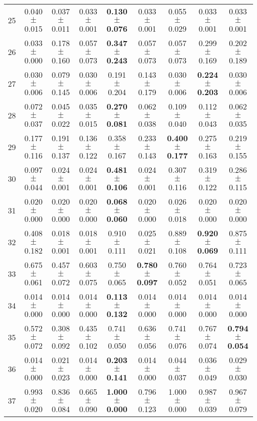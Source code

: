 \begin{table}[!ht]
{\begin{tabular}{r c c c c c c c c}
25 & 0.040 $\pm$ 0.015 & 0.037 $\pm$ 0.011 & 0.033 $\pm$ 0.001 & \textbf{0.130 $\pm$ 0.076} & 0.033 $\pm$ 0.001 & 0.055 $\pm$ 0.029 & 0.033 $\pm$ 0.001 & 0.033 $\pm$ 0.001 \\
26 & 0.033 $\pm$ 0.000 & 0.178 $\pm$ 0.160 & 0.057 $\pm$ 0.073 & \textbf{0.347 $\pm$ 0.243} & 0.057 $\pm$ 0.073 & 0.057 $\pm$ 0.073 & 0.299 $\pm$ 0.169 & 0.202 $\pm$ 0.189 \\
27 & 0.030 $\pm$ 0.006 & 0.079 $\pm$ 0.145 & 0.030 $\pm$ 0.006 & 0.191 $\pm$ 0.204 & 0.143 $\pm$ 0.179 & 0.030 $\pm$ 0.006 & \textbf{0.224 $\pm$ 0.203} & 0.030 $\pm$ 0.006 \\
28 & 0.072 $\pm$ 0.037 & 0.045 $\pm$ 0.022 & 0.035 $\pm$ 0.015 & \textbf{0.270 $\pm$ 0.081} & 0.062 $\pm$ 0.038 & 0.109 $\pm$ 0.040 & 0.112 $\pm$ 0.043 & 0.062 $\pm$ 0.035 \\
29 & 0.177 $\pm$ 0.116 & 0.191 $\pm$ 0.137 & 0.136 $\pm$ 0.122 & 0.358 $\pm$ 0.167 & 0.233 $\pm$ 0.143 & \textbf{0.400 $\pm$ 0.177} & 0.275 $\pm$ 0.163 & 0.219 $\pm$ 0.155 \\
30 & 0.097 $\pm$ 0.044 & 0.024 $\pm$ 0.001 & 0.024 $\pm$ 0.001 & \textbf{0.481 $\pm$ 0.106} & 0.024 $\pm$ 0.001 & 0.307 $\pm$ 0.116 & 0.319 $\pm$ 0.122 & 0.286 $\pm$ 0.115 \\
31 & 0.020 $\pm$ 0.000 & 0.020 $\pm$ 0.000 & 0.020 $\pm$ 0.000 & \textbf{0.068 $\pm$ 0.060} & 0.020 $\pm$ 0.000 & 0.026 $\pm$ 0.018 & 0.020 $\pm$ 0.000 & 0.020 $\pm$ 0.000 \\
32 & 0.408 $\pm$ 0.182 & 0.018 $\pm$ 0.001 & 0.018 $\pm$ 0.001 & 0.910 $\pm$ 0.111 & 0.025 $\pm$ 0.021 & 0.889 $\pm$ 0.108 & \textbf{0.920 $\pm$ 0.069} & 0.875 $\pm$ 0.111 \\
33 & 0.675 $\pm$ 0.061 & 0.457 $\pm$ 0.072 & 0.603 $\pm$ 0.075 & 0.750 $\pm$ 0.065 & \textbf{0.780 $\pm$ 0.097} & 0.760 $\pm$ 0.052 & 0.764 $\pm$ 0.051 & 0.723 $\pm$ 0.065 \\
34 & 0.014 $\pm$ 0.000 & 0.014 $\pm$ 0.000 & 0.014 $\pm$ 0.000 & \textbf{0.113 $\pm$ 0.132} & 0.014 $\pm$ 0.000 & 0.014 $\pm$ 0.000 & 0.014 $\pm$ 0.000 & 0.014 $\pm$ 0.000 \\
35 & 0.572 $\pm$ 0.072 & 0.308 $\pm$ 0.092 & 0.435 $\pm$ 0.102 & 0.741 $\pm$ 0.050 & 0.636 $\pm$ 0.056 & 0.741 $\pm$ 0.076 & 0.767 $\pm$ 0.074 & \textbf{0.794 $\pm$ 0.054} \\
36 & 0.014 $\pm$ 0.000 & 0.021 $\pm$ 0.023 & 0.014 $\pm$ 0.000 & \textbf{0.203 $\pm$ 0.141} & 0.014 $\pm$ 0.000 & 0.044 $\pm$ 0.037 & 0.036 $\pm$ 0.049 & 0.029 $\pm$ 0.030 \\
37 & 0.993 $\pm$ 0.020 & 0.836 $\pm$ 0.084 & 0.665 $\pm$ 0.090 & \textbf{1.000 $\pm$ 0.000} & 0.796 $\pm$ 0.123 & 1.000 $\pm$ 0.000 & 0.987 $\pm$ 0.039 & 0.967 $\pm$ 0.079 \\

\end{tabular}}
\end{table}
